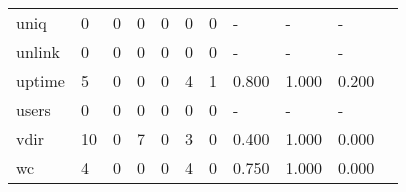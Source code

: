 \begin{longtable}{lp{1.2cm}p{1.2cm}p{1.2cm}p{1.2cm}p{1.2cm}p{1.2cm}p{1.2cm}p{1.2cm}p{1.2cm}p{1.2cm}}
uniq      &                                     0 &                                                  0 &                                                0 &                                               0 &                                                0 &                                              0 &                                                  - &                                                  - &                                                  - \\
unlink    &                                     0 &                                                  0 &                                                0 &                                               0 &                                                0 &                                              0 &                                                  - &                                                  - &                                                  - \\
uptime    &                                     5 &                                                  0 &                                                0 &                                               0 &                                                4 &                                              1 &                                              0.800 &                                              1.000 &                                              0.200 \\
users     &                                     0 &                                                  0 &                                                0 &                                               0 &                                                0 &                                              0 &                                                  - &                                                  - &                                                  - \\
vdir      &                                    10 &                                                  0 &                                                7 &                                               0 &                                                3 &                                              0 &                                              0.400 &                                              1.000 &                                              0.000 \\
wc        &                                     4 &                                                  0 &                                                0 &                                               0 &                                                4 &                                              0 &                                              0.750 &                                              1.000 &                                              0.000 \\

\end{longtable}
